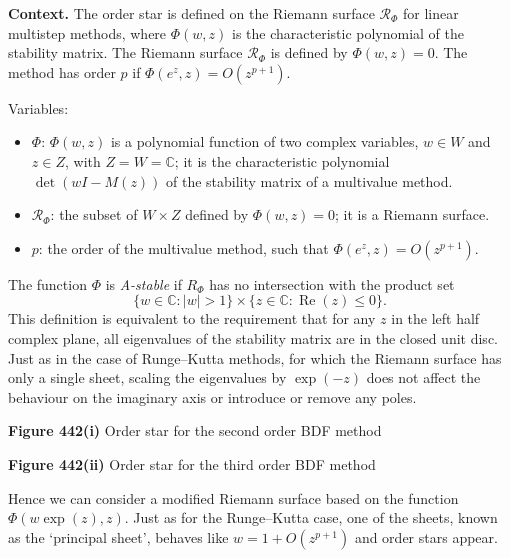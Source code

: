 \begin{theorem}
\noindent\textbf{Context.}
The order star is defined on the Riemann surface $\mathcal{R}_\Phi$ for linear multistep methods, where $\Phi(w,z)$ is the characteristic polynomial of the stability matrix. The Riemann surface $\mathcal{R}_\Phi$ is defined by $\Phi(w,z)=0$. The method has order $p$ if $\Phi(e^{z},z)=O(z^{p+1})$.

Variables:
\begin{itemize}
    \item $\Phi$: $\Phi(w,z)$ is a polynomial function of two complex variables, $w \in W$ and $z \in Z$, with $Z=W=\mathbb{C}$; it is the characteristic polynomial $\det(wI - M(z))$ of the stability matrix of a multivalue method.
    \item $\mathcal{R}_\Phi$: the subset of $W \times Z$ defined by $\Phi(w,z)=0$; it is a Riemann surface.
    \item $p$: the order of the multivalue method, such that $\Phi(e^{z},z)=O(z^{p+1})$.
\end{itemize}

\begin{definition}

  \label{def:442A}
The function $\Phi$ is \textit{A-stable} if $R_\Phi$ has no intersection with the product set
\[
\{w \in \mathbb{C} : |w| > 1\} \times \{z \in \mathbb{C} : \operatorname{Re}(z) \leq 0\}.
\]
This definition is equivalent to the requirement that for any $z$ in the left half complex plane, all eigenvalues of the stability matrix are in the closed unit disc. Just as in the case of Runge--Kutta methods, for which the Riemann surface has only a single sheet, scaling the eigenvalues by $\exp(-z)$ does not affect the behaviour on the imaginary axis or introduce or remove any poles.

\begin{center}
\textbf{Figure 442(i)} \quad Order star for the second order BDF method

\textbf{Figure 442(ii)} \quad Order star for the third order BDF method
\end{center}

Hence we can consider a modified Riemann surface based on the function $\Phi(w \exp(z), z)$. Just as for the Runge--Kutta case, one of the sheets, known as the `principal sheet', behaves like $w = 1 + O(z^{p+1})$ and order stars appear.


\end{definition}
\end{theorem}
